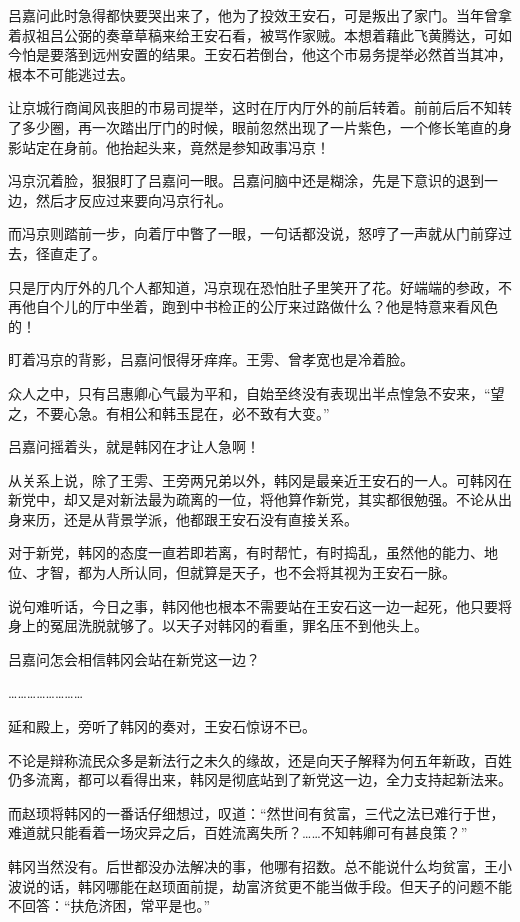 吕嘉问此时急得都快要哭出来了，他为了投效王安石，可是叛出了家门。当年曾拿着叔祖吕公弼的奏章草稿来给王安石看，被骂作家贼。本想着藉此飞黄腾达，可如今怕是要落到远州安置的结果。王安石若倒台，他这个市易务提举必然首当其冲，根本不可能逃过去。

让京城行商闻风丧胆的市易司提举，这时在厅内厅外的前后转着。前前后后不知转了多少圈，再一次踏出厅门的时候，眼前忽然出现了一片紫色，一个修长笔直的身影站定在身前。他抬起头来，竟然是参知政事冯京！

冯京沉着脸，狠狠盯了吕嘉问一眼。吕嘉问脑中还是糊涂，先是下意识的退到一边，然后才反应过来要向冯京行礼。

而冯京则踏前一步，向着厅中瞥了一眼，一句话都没说，怒哼了一声就从门前穿过去，径直走了。

只是厅内厅外的几个人都知道，冯京现在恐怕肚子里笑开了花。好端端的参政，不再他自个儿的厅中坐着，跑到中书检正的公厅来过路做什么？他是特意来看风色的！

盯着冯京的背影，吕嘉问恨得牙痒痒。王雱、曾孝宽也是冷着脸。

众人之中，只有吕惠卿心气最为平和，自始至终没有表现出半点惶急不安来，“望之，不要心急。有相公和韩玉昆在，必不致有大变。”

吕嘉问摇着头，就是韩冈在才让人急啊！

从关系上说，除了王雱、王旁两兄弟以外，韩冈是最亲近王安石的一人。可韩冈在新党中，却又是对新法最为疏离的一位，将他算作新党，其实都很勉强。不论从出身来历，还是从背景学派，他都跟王安石没有直接关系。

对于新党，韩冈的态度一直若即若离，有时帮忙，有时捣乱，虽然他的能力、地位、才智，都为人所认同，但就算是天子，也不会将其视为王安石一脉。

说句难听话，今日之事，韩冈他也根本不需要站在王安石这一边一起死，他只要将身上的冤屈洗脱就够了。以天子对韩冈的看重，罪名压不到他头上。

吕嘉问怎会相信韩冈会站在新党这一边？

……………………

延和殿上，旁听了韩冈的奏对，王安石惊讶不已。

不论是辩称流民众多是新法行之未久的缘故，还是向天子解释为何五年新政，百姓仍多流离，都可以看得出来，韩冈是彻底站到了新党这一边，全力支持起新法来。

而赵顼将韩冈的一番话仔细想过，叹道：“然世间有贫富，三代之法已难行于世，难道就只能看着一场灾异之后，百姓流离失所？……不知韩卿可有甚良策？”

韩冈当然没有。后世都没办法解决的事，他哪有招数。总不能说什么均贫富，王小波说的话，韩冈哪能在赵顼面前提，劫富济贫更不能当做手段。但天子的问题不能不回答：“扶危济困，常平是也。”

